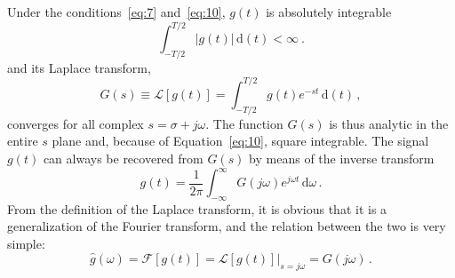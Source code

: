 Under the conditions~\eqref{eq:7} and~\eqref{eq:10}, $g(t)$ is
absolutely integrable
\begin{equation}
  \label{eq:11}
  \int^{T/2}_{-T/2}|g(t)|\,\mathrm{d}(t) < \infty \ .
\end{equation}
and its Laplace transform,
\begin{equation}
  \label{eq:12}
  G(s) \equiv \mathcal{L}[g(t)] =
  \int^{T/2}_{-T/2}g(t)e^{-st}\,\mathrm{d}(t)\,, 
\end{equation}
converges for all complex $s = \sigma + j\omega$. The function $G(s)$
is thus analytic in the entire $s$ plane and, because of
Equation~\eqref{eq:10}, square integrable. The signal $g(t)$ can
always be recovered from $G(s)$ by means of the inverse
transform%
\begin{equation}
  \label{eq:13}
  g(t) = \frac{1}{2\pi}\int_{-\infty}^{\infty}G(j\omega)e^{j\omega
    t}\, \mathrm{d}\omega \,. 
\end{equation}
From the definition of the Laplace transform, it is obvious that it is
a generalization of the Fourier transform, and the relation between
the two is very simple:
\begin{equation}
  \label{eq:95}
  \hat{g}(\omega) = \mathcal{F}[g(t)] =
  \mathcal{L}[g(t)]\Big\vert_{s=j\omega}=G(j\omega)\,. 
\end{equation}


